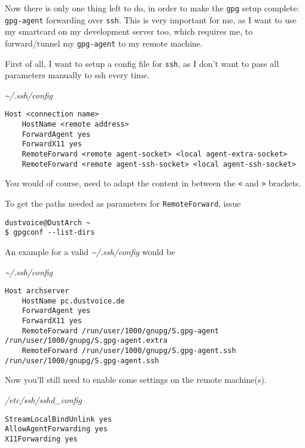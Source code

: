 \documentclass[10pt]{dustdoc}
\begin{document}
Now there is only one thing left to do, in order to make the \texttt{gpg} setup complete: \texttt{gpg-agent} forwarding over \texttt{ssh}.
This is very important for me, as I want to use my smartcard on my development server too, which requires me, to forward/tunnel my \texttt{gpg-agent} to my remote machine.

First of all, I want to setup a config file for \texttt{ssh}, as I don’t want to pass all parameters manually to ssh every time.

\begin{mintedlisting}
    \caption*{\textit{\~{}/.ssh/config}}
    \begin{verbatim}
Host <connection name>
    HostName <remote address>
    ForwardAgent yes
    ForwardX11 yes
    RemoteForward <remote agent-socket> <local agent-extra-socket>
    RemoteForward <remote agent-ssh-socket> <local agent-ssh-socket>
    \end{verbatim}
\end{mintedlisting}

\begin{NOTE}
    You would of course, need to adapt the content in between the \texttt{<} and \texttt{>} brackets.

    To get the paths needed as parameters for \texttt{RemoteForward}, issue

    \begin{verbatim}
dustvoice@DustArch ~
$ gpgconf --list-dirs
    \end{verbatim}
\end{NOTE}

\begin{example}
    An example for a valid \textit{\~{}/.ssh/config} would be

    \begin{mintedlisting}
        \caption*{\textit{\~{}/.ssh/config}}
        \begin{verbatim}
Host archserver
    HostName pc.dustvoice.de
    ForwardAgent yes
    ForwardX11 yes
    RemoteForward /run/user/1000/gnupg/S.gpg-agent /run/user/1000/gnupg/S.gpg-agent.extra
    RemoteForward /run/user/1000/gnupg/S.gpg-agent.ssh /run/user/1000/gnupg/S.gpg-agent.ssh
        \end{verbatim}
    \end{mintedlisting}
\end{example}

Now you’ll still need to enable some settings on the remote machine(s).

\begin{mintedlisting}
    \caption*{\textit{/etc/ssh/sshd\_config}}
    \begin{verbatim}
StreamLocalBindUnlink yes
AllowAgentForwarding yes
X11Forwarding yes
    \end{verbatim}
\end{mintedlisting}
\end{document}
